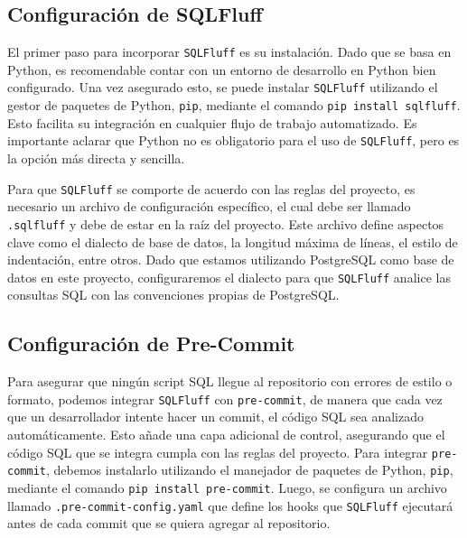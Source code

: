 \documentclass{IEEEtran}
\begin{document}
\subsection{Configuración de SQLFluff}
El primer paso para incorporar \texttt{SQLFluff} es su instalación. Dado que se basa en Python, es recomendable contar con un entorno de desarrollo en Python bien configurado. Una vez asegurado esto, se puede instalar \texttt{SQLFluff} utilizando el gestor de paquetes de Python, \texttt{pip}, mediante el comando \texttt{pip install sqlfluff}. Esto facilita su integración en cualquier flujo de trabajo automatizado. Es importante aclarar que Python no es obligatorio para el uso de \texttt{SQLFluff}, pero es la opción más directa y sencilla.

Para que \texttt{SQLFluff} se comporte de acuerdo con las reglas del proyecto, es necesario un archivo de configuración específico, el cual debe ser llamado \texttt{.sqlfluff} y debe de estar en la raíz del proyecto. Este archivo define aspectos clave como el dialecto de base de datos, la longitud máxima de líneas, el estilo de indentación, entre otros. Dado que estamos utilizando PostgreSQL como base de datos en este proyecto, configuraremos el dialecto para que \texttt{SQLFluff} analice las consultas SQL con las convenciones propias de PostgreSQL.




\subsection{Configuración de Pre-Commit}
Para asegurar que ningún script SQL llegue al repositorio con errores de estilo o formato, podemos integrar \texttt{SQLFluff} con \texttt{pre-commit}, de manera que cada vez que un desarrollador intente hacer un commit, el código SQL sea analizado automáticamente. Esto añade una capa adicional de control, asegurando que el código SQL que se integra cumpla con las reglas del proyecto. Para integrar \texttt{pre-commit}, debemos instalarlo utilizando el manejador de paquetes de Python, \texttt{pip}, mediante el comando \texttt{pip install pre-commit}. Luego, se configura un archivo llamado \texttt{.pre-commit-config.yaml} que define los hooks que \texttt{SQLFluff} ejecutará antes de cada commit que se quiera agregar al repositorio.
\end{document}
